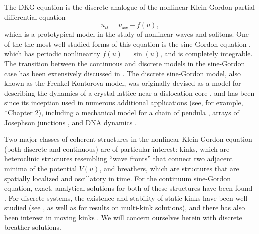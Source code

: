 \documentclass[12pt,reqno]{amsart}
\theoremstyle{definition}
\begin{document}
The DKG equation is the discrete analogue of the nonlinear Klein-Gordon partial differential equation
\begin{equation*}
u_{tt} = u_{xx} - f(u),
\end{equation*}
which is a prototypical model in the study of nonlinear waves and solitons. One of the the most well-studied forms of this equation is the sine-Gordon equation \cites{braun2004,SGbook,p4book,kivsharmalomed}, which has periodic nonlinearity $f(u)=\sin(u)$, and is completely integrable. The transition between the continuous and discrete models in the sine-Gordon case has been extensively discussed in \cite{SGchapter}. The discrete sine-Gordon model, also known as the Frenkel-Kontorova model, was originally devised as a model for describing the dynamics of a crystal lattice near a dislocation core \cites{braun1998,braun2004}, and has been since its inception 
used in numerous additional applications (see, for example, \cite{braun2004}*{Chapter 2}), including a mechanical model for a chain of pendula \cites{Scott1969,english}, arrays of Josephson junctions \cites{Ustinov1992,Floria1998}, and DNA dynamics \cites{Yomosa1983,Yakushevich1998,DeLeo2011}.

Two major classes of coherent structures in the nonlinear Klein-Gordon equation (both discrete and continuous) are of particular interest: kinks, which are heteroclinic structures resembling ``wave fronts'' that connect two adjacent minima of the potential $V(u)$, and breathers, which are structures that are spatially localized and oscillatory in time. For the continuum sine-Gordon equation, exact, analytical solutions for both of these structures have been found \cite{SolitonBook1}. 
For discrete systems, the existence and stability of static kinks have been well-studied (see \cites{PEYRARD198488,KevrekidisWeinstein2000,SGchapter}, as well as \cite{Parker2021} for results on multi-kink solutions), and there has also been interest in moving kinks \cites{Aigner2003,Iooss2006,Cisneros2008}. We will concern ourselves herein with discrete breather solutions.
\end{document}
